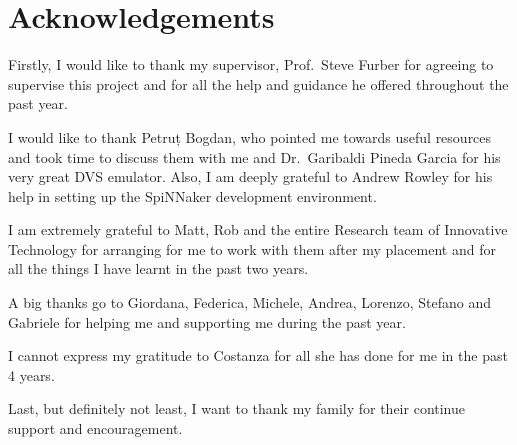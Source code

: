 \chapter*{Acknowledgements}
Firstly, I would like to thank my supervisor, Prof.\ Steve Furber for agreeing to supervise this project and for all the help and guidance he offered throughout the past year. 

I would like to thank Petruț Bogdan, who pointed me towards useful resources and took time to discuss them with me and Dr.\ Garibaldi Pineda Garcia for his very great DVS emulator. Also, I am deeply grateful to Andrew Rowley for his help in setting up the SpiNNaker development environment. 

I am extremely grateful to Matt, Rob and the entire Research team of Innovative Technology for arranging for me to work with them after my placement and for all the things I have learnt in the past two years.

A big thanks go to Giordana, Federica, Michele, Andrea, Lorenzo, Stefano and Gabriele for helping me and supporting me during the past year. 

I cannot express my gratitude to Costanza for all she has done for me in the past 4 years. 

Last, but definitely not least, I want to thank my family for their continue support and encouragement.